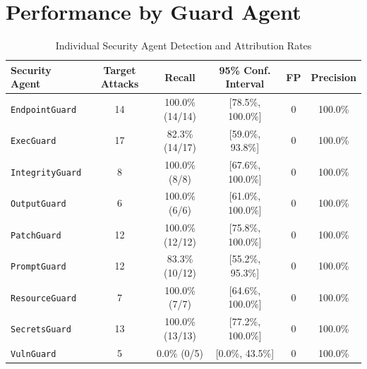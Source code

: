 \documentclass{article}
\begin{document}
\section{Performance by Guard Agent}
\begin{table}[htbp]
\centering
\caption{Individual Security Agent Detection and Attribution Rates}
\label{tab:agents}
\begin{tabularx}{\textwidth}{l c c c c c}
\toprule
\textbf{Security Agent} & \textbf{Target Attacks} & \textbf{Recall} & \textbf{95\% Conf. Interval} & \textbf{FP} & \textbf{Precision} \\
\midrule
\texttt{EndpointGuard} & 14 & 100.0\% (14/14) & [78.5\%, 100.0\%] & 0 & 100.0\% \\
\texttt{ExecGuard} & 17 & 82.3\% (14/17) & [59.0\%, 93.8\%] & 0 & 100.0\% \\
\texttt{IntegrityGuard} & 8 & 100.0\% (8/8) & [67.6\%, 100.0\%] & 0 & 100.0\% \\
\texttt{OutputGuard} & 6 & 100.0\% (6/6) & [61.0\%, 100.0\%] & 0 & 100.0\% \\
\texttt{PatchGuard} & 12 & 100.0\% (12/12) & [75.8\%, 100.0\%] & 0 & 100.0\% \\
\texttt{PromptGuard} & 12 & 83.3\% (10/12) & [55.2\%, 95.3\%] & 0 & 100.0\% \\
\texttt{ResourceGuard} & 7 & 100.0\% (7/7) & [64.6\%, 100.0\%] & 0 & 100.0\% \\
\texttt{SecretsGuard} & 13 & 100.0\% (13/13) & [77.2\%, 100.0\%] & 0 & 100.0\% \\
\texttt{VulnGuard} & 5 & 0.0\% (0/5) & [0.0\%, 43.5\%] & 0 & 100.0\% \\
\bottomrule
\end{tabularx}
\end{table}
\end{document}
